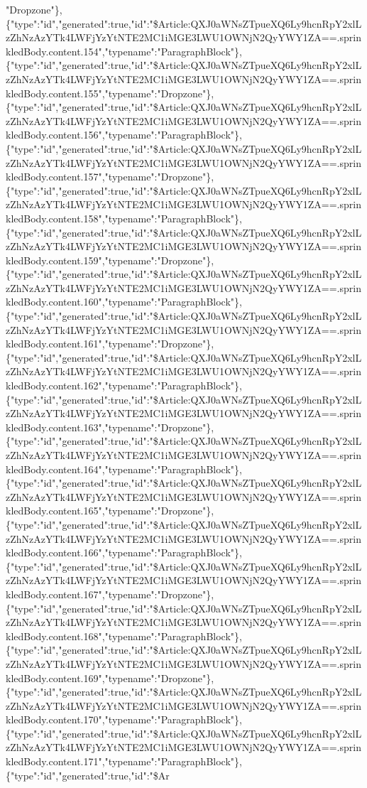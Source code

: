 "Dropzone"\},\{"type":"id","generated":true,"id":"\$Article:QXJ0aWNsZTpueXQ6Ly9hcnRpY2xlLzZhNzAzYTk4LWFjYzYtNTE2MC1iMGE3LWU1OWNjN2QyYWY1ZA==.sprinkledBody.content.154","typename":"ParagraphBlock"\},\{"type":"id","generated":true,"id":"\$Article:QXJ0aWNsZTpueXQ6Ly9hcnRpY2xlLzZhNzAzYTk4LWFjYzYtNTE2MC1iMGE3LWU1OWNjN2QyYWY1ZA==.sprinkledBody.content.155","typename":"Dropzone"\},\{"type":"id","generated":true,"id":"\$Article:QXJ0aWNsZTpueXQ6Ly9hcnRpY2xlLzZhNzAzYTk4LWFjYzYtNTE2MC1iMGE3LWU1OWNjN2QyYWY1ZA==.sprinkledBody.content.156","typename":"ParagraphBlock"\},\{"type":"id","generated":true,"id":"\$Article:QXJ0aWNsZTpueXQ6Ly9hcnRpY2xlLzZhNzAzYTk4LWFjYzYtNTE2MC1iMGE3LWU1OWNjN2QyYWY1ZA==.sprinkledBody.content.157","typename":"Dropzone"\},\{"type":"id","generated":true,"id":"\$Article:QXJ0aWNsZTpueXQ6Ly9hcnRpY2xlLzZhNzAzYTk4LWFjYzYtNTE2MC1iMGE3LWU1OWNjN2QyYWY1ZA==.sprinkledBody.content.158","typename":"ParagraphBlock"\},\{"type":"id","generated":true,"id":"\$Article:QXJ0aWNsZTpueXQ6Ly9hcnRpY2xlLzZhNzAzYTk4LWFjYzYtNTE2MC1iMGE3LWU1OWNjN2QyYWY1ZA==.sprinkledBody.content.159","typename":"Dropzone"\},\{"type":"id","generated":true,"id":"\$Article:QXJ0aWNsZTpueXQ6Ly9hcnRpY2xlLzZhNzAzYTk4LWFjYzYtNTE2MC1iMGE3LWU1OWNjN2QyYWY1ZA==.sprinkledBody.content.160","typename":"ParagraphBlock"\},\{"type":"id","generated":true,"id":"\$Article:QXJ0aWNsZTpueXQ6Ly9hcnRpY2xlLzZhNzAzYTk4LWFjYzYtNTE2MC1iMGE3LWU1OWNjN2QyYWY1ZA==.sprinkledBody.content.161","typename":"Dropzone"\},\{"type":"id","generated":true,"id":"\$Article:QXJ0aWNsZTpueXQ6Ly9hcnRpY2xlLzZhNzAzYTk4LWFjYzYtNTE2MC1iMGE3LWU1OWNjN2QyYWY1ZA==.sprinkledBody.content.162","typename":"ParagraphBlock"\},\{"type":"id","generated":true,"id":"\$Article:QXJ0aWNsZTpueXQ6Ly9hcnRpY2xlLzZhNzAzYTk4LWFjYzYtNTE2MC1iMGE3LWU1OWNjN2QyYWY1ZA==.sprinkledBody.content.163","typename":"Dropzone"\},\{"type":"id","generated":true,"id":"\$Article:QXJ0aWNsZTpueXQ6Ly9hcnRpY2xlLzZhNzAzYTk4LWFjYzYtNTE2MC1iMGE3LWU1OWNjN2QyYWY1ZA==.sprinkledBody.content.164","typename":"ParagraphBlock"\},\{"type":"id","generated":true,"id":"\$Article:QXJ0aWNsZTpueXQ6Ly9hcnRpY2xlLzZhNzAzYTk4LWFjYzYtNTE2MC1iMGE3LWU1OWNjN2QyYWY1ZA==.sprinkledBody.content.165","typename":"Dropzone"\},\{"type":"id","generated":true,"id":"\$Article:QXJ0aWNsZTpueXQ6Ly9hcnRpY2xlLzZhNzAzYTk4LWFjYzYtNTE2MC1iMGE3LWU1OWNjN2QyYWY1ZA==.sprinkledBody.content.166","typename":"ParagraphBlock"\},\{"type":"id","generated":true,"id":"\$Article:QXJ0aWNsZTpueXQ6Ly9hcnRpY2xlLzZhNzAzYTk4LWFjYzYtNTE2MC1iMGE3LWU1OWNjN2QyYWY1ZA==.sprinkledBody.content.167","typename":"Dropzone"\},\{"type":"id","generated":true,"id":"\$Article:QXJ0aWNsZTpueXQ6Ly9hcnRpY2xlLzZhNzAzYTk4LWFjYzYtNTE2MC1iMGE3LWU1OWNjN2QyYWY1ZA==.sprinkledBody.content.168","typename":"ParagraphBlock"\},\{"type":"id","generated":true,"id":"\$Article:QXJ0aWNsZTpueXQ6Ly9hcnRpY2xlLzZhNzAzYTk4LWFjYzYtNTE2MC1iMGE3LWU1OWNjN2QyYWY1ZA==.sprinkledBody.content.169","typename":"Dropzone"\},\{"type":"id","generated":true,"id":"\$Article:QXJ0aWNsZTpueXQ6Ly9hcnRpY2xlLzZhNzAzYTk4LWFjYzYtNTE2MC1iMGE3LWU1OWNjN2QyYWY1ZA==.sprinkledBody.content.170","typename":"ParagraphBlock"\},\{"type":"id","generated":true,"id":"\$Article:QXJ0aWNsZTpueXQ6Ly9hcnRpY2xlLzZhNzAzYTk4LWFjYzYtNTE2MC1iMGE3LWU1OWNjN2QyYWY1ZA==.sprinkledBody.content.171","typename":"ParagraphBlock"\},\{"type":"id","generated":true,"id":"\$Ar